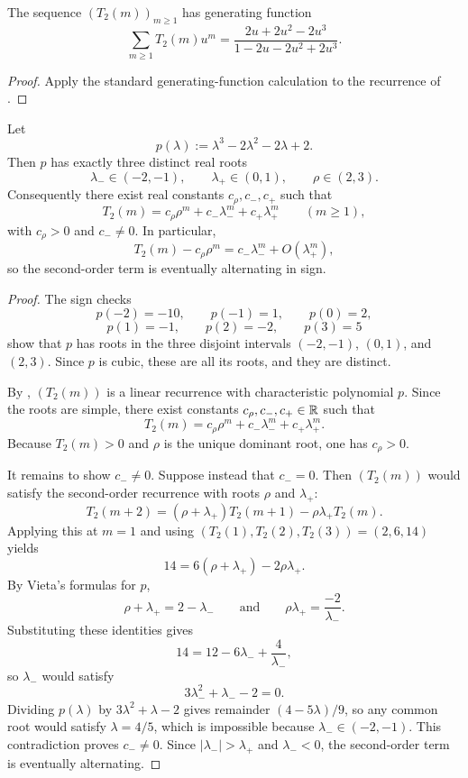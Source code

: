 \begin{corollary}
\label{cor:sigma-generating}
The sequence \((T_2(m))_{m\ge 1}\) has generating function
\[
  \sum_{m\ge 1}T_2(m)u^m
  =
  \frac{2u+2u^2-2u^3}{1-2u-2u^2+2u^3}.
\]
\end{corollary}

\begin{proof}
Apply the standard generating-function calculation to the recurrence of
.
\end{proof}

\begin{theorem}
\label{thm:q2-alternating-second-order}
Let
\[
  p(\lambda):=\lambda^3-2\lambda^2-2\lambda+2.
\]
Then \(p\) has exactly three distinct real roots
\[
  \lambda_-\in(-2,-1),
  \qquad
  \lambda_+\in(0,1),
  \qquad
  \rho\in(2,3).
\]
Consequently there exist real constants \(c_\rho,c_-,c_+\) such that
\[
  T_2(m)=c_\rho\rho^m+c_-\lambda_-^m+c_+\lambda_+^m
  \qquad (m\ge 1),
\]
with \(c_\rho>0\) and \(c_-\neq 0\).  In particular,
\[
  T_2(m)-c_\rho\rho^m
  =
  c_-\lambda_-^m+O(\lambda_+^m),
\]
so the second-order term is eventually alternating in sign.
\end{theorem}

\begin{proof}
The sign checks
\[
  p(-2)=-10,\qquad p(-1)=1,\qquad p(0)=2,
\]
\[
  p(1)=-1,\qquad p(2)=-2,\qquad p(3)=5
\]
show that \(p\) has roots in the three disjoint intervals
\((-2,-1)\), \((0,1)\), and \((2,3)\).  Since \(p\) is cubic, these are all
its roots, and they are distinct.

By , \((T_2(m))\) is a linear recurrence with
characteristic polynomial \(p\).  Since the roots are simple, there exist
constants \(c_\rho,c_-,c_+\in\mathbb{R}\) such that
\[
  T_2(m)=c_\rho\rho^m+c_-\lambda_-^m+c_+\lambda_+^m.
\]
Because \(T_2(m)>0\) and \(\rho\) is the unique dominant root, one has
\(c_\rho>0\).

It remains to show \(c_-\neq 0\).  Suppose instead that \(c_-=0\).  Then
\((T_2(m))\) would satisfy the second-order recurrence with roots \(\rho\) and
\(\lambda_+\):
\[
  T_2(m+2)=(\rho+\lambda_+)T_2(m+1)-\rho\lambda_+T_2(m).
\]
Applying this at \(m=1\) and using \((T_2(1),T_2(2),T_2(3))=(2,6,14)\) yields
\[
  14=6(\rho+\lambda_+)-2\rho\lambda_+.
\]
By Vieta's formulas for \(p\),
\[
  \rho+\lambda_+=2-\lambda_-
  \qquad\text{and}\qquad
  \rho\lambda_+=\frac{-2}{\lambda_-}.
\]
Substituting these identities gives
\[
  14=12-6\lambda_-+\frac{4}{\lambda_-},
\]
so \(\lambda_-\) would satisfy
\[
  3\lambda_-^2+\lambda_--2=0.
\]
Dividing \(p(\lambda)\) by \(3\lambda^2+\lambda-2\) gives remainder
\((4-5\lambda)/9\), so any common root would satisfy \(\lambda=4/5\), which is
impossible because \(\lambda_-\in(-2,-1)\).  This contradiction proves
\(c_-\neq 0\).  Since \(|\lambda_-|>\lambda_+\) and \(\lambda_-<0\), the
second-order term is eventually alternating.
\end{proof}

